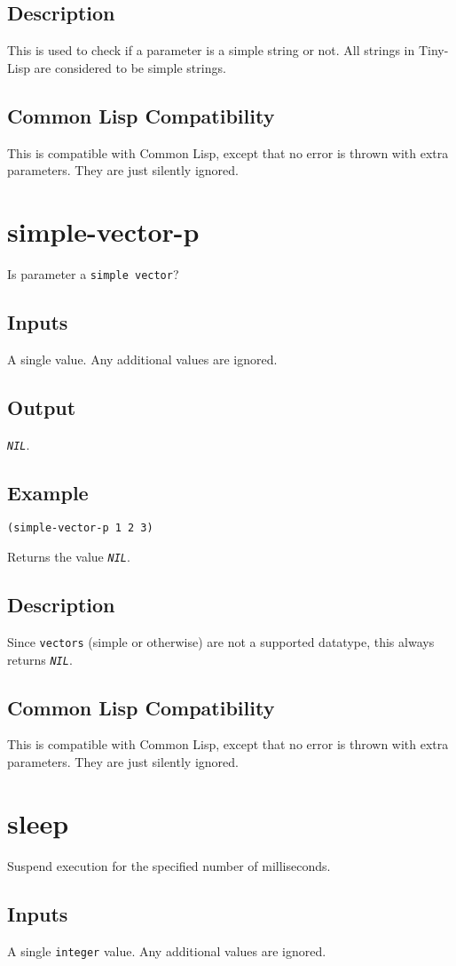 \documentclass[10pt, openany]{book}
\newcommand{\constant}[1]{\emph{\texttt{#1}}}
\newcommand{\datatype}[1]{\texttt{#1}}
\newcommand{\tl}{Tiny-Lisp}
\newcommand{\cl}{Common Lisp}
\begin{document}
\subsection{Description}
This is used to check if a parameter is a simple string or not.  All strings in \tl{} are considered to be simple strings.
\subsection{Common Lisp Compatibility}
This is compatible with \cl, except that no error is thrown with extra parameters.  They are just silently ignored.

\section{simple-vector-p}
Is parameter a \datatype{simple vector}?
\subsection{Inputs}
A single value.  Any additional values are ignored.
\subsection{Output}
\constant{NIL}.
\subsection{Example}
\begin{lstlisting}
(simple-vector-p 1 2 3)
\end{lstlisting}
Returns the value \constant{NIL}.
\subsection{Description}
Since \datatype{vectors} (simple or otherwise) are not a supported datatype, this always returns \constant{NIL}.
\subsection{Common Lisp Compatibility}
This is compatible with \cl, except that no error is thrown with extra parameters.  They are just silently ignored.

\section{sleep}
Suspend execution for the specified number of milliseconds.
\subsection{Inputs}
A single \datatype{integer} value.  Any additional values are ignored.
\end{document}
